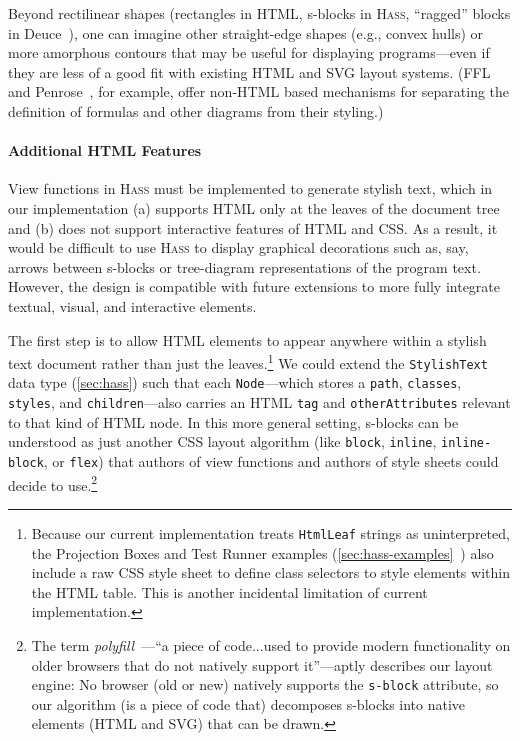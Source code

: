 \documentclass[acmsmall, screen]{acmart}
\newcommand{\parahead}[1]
  {\paragraph{\textbf{#1}}}
\newcommand{\refAppendixHassExamples}
  {\autoref{sec:hass-examples}~\cite{Hass}}
\newcommand{\hass}
{\textsc{Hass}}
\newcommand{\cssAttr}[1]
{\texttt{#1}}
\begin{document}
Beyond rectilinear shapes (rectangles in HTML, s-blocks in \hass{}, ``ragged'' blocks in Deuce~\cite{Hempel2018}), one can imagine other straight-edge shapes (e.g., convex hulls) or more amorphous contours that may be useful for displaying programs---even if they are less of a good fit with existing HTML and SVG layout systems.
(FFL~\citep{Wu2023} and Penrose~\citep{Ye2020}, for example, offer non-HTML based mechanisms for separating the definition of formulas and other diagrams from their styling.)


\parahead{Additional HTML Features}



View functions in \hass{} must be implemented to generate stylish text, which in our implementation (a) supports HTML only at the leaves of the document tree and (b) does not support interactive features of HTML and CSS.
As a result, it would be difficult to use \hass{} to display graphical decorations such as, say, arrows between s-blocks or tree-diagram representations of the program text.
However, the design is compatible with future extensions to more fully integrate textual, visual, and interactive elements.

The first step is to allow HTML elements to appear anywhere within a stylish text document rather than just the leaves.\footnote{
Because our current implementation treats \texttt{HtmlLeaf} strings as uninterpreted, the Projection Boxes and Test Runner examples (\refAppendixHassExamples{}) also include a raw CSS style sheet to define class selectors to style elements within the HTML table. This is another incidental limitation of current implementation.
}
We could extend the \texttt{StylishText} data type (\autoref{sec:hass}) such that each \verb+Node+---which stores a \texttt{path}, \texttt{classes}, \texttt{styles}, and \texttt{children}---also carries an HTML \texttt{tag} and \texttt{otherAttributes} relevant to that kind of HTML node.
In this more general setting, s-blocks can be understood as just another CSS layout algorithm (like \texttt{block}, \texttt{inline}, \texttt{inline-block}, or \texttt{flex}) that authors of view functions and authors of style sheets could decide to use.\footnote{
The term \emph{polyfill}~\cite{mdnDocs}---``a piece of code...used to provide modern functionality on older browsers that do not natively support it''---aptly describes our layout engine:
No browser (old or new) natively supports the \cssAttr{s-block} attribute,
so our algorithm (is a piece of code that) decomposes s-blocks into native elements (HTML and SVG) that can be drawn.
}
\end{document}
